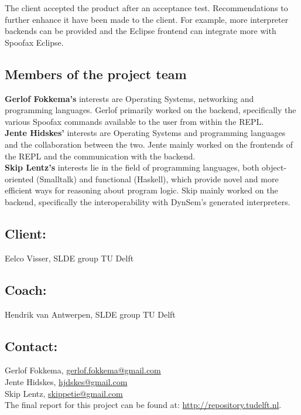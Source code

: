 The client accepted the product after an acceptance test. Recommendations to
further enhance it have been made to the client. For example, more interpreter
backends can be provided and the Eclipse frontend can integrate more with
Spoofax Eclipse.

\subsection*{Members of the project team}
\textbf{Gerlof Fokkema's} interests are Operating Systems, networking and
programming languages. Gerlof primarily worked on the backend, specifically the
various Spoofax commands available to the user from within the REPL.\\
\textbf{Jente Hidskes'} interests are Operating Systems and programming
languages and the collaboration between the two. Jente mainly worked
on the frontends of the REPL and the communication with the backend.\\
\textbf{Skip Lentz's} interests lie in the field of programming languages,
both object-oriented (Smalltalk) and functional (Haskell), which provide
novel and more efficient ways for reasoning about program logic. Skip mainly
worked on the backend, specifically the interoperability with DynSem's
generated interpreters.

\subsection*{Client:}
Eelco Visser, SLDE group TU Delft

\subsection*{Coach:}
Hendrik van Antwerpen, SLDE group TU Delft

\subsection*{Contact:}
Gerlof Fokkema, \href{mailto:gerlof.fokkema@gmail.com}{gerlof.fokkema@gmail.com}\\
Jente Hidskes, \href{mailto:hjdskes@gmail.com}{hjdskes@gmail.com}\\
Skip Lentz, \href{mailto:skippetie@gmail.com}{skippetie@gmail.com}\\

\noindent The final report for this project can be found at: \url{http://repository.tudelft.nl}.

